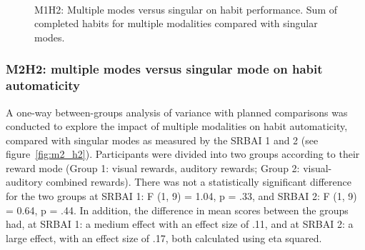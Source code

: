 \begin{figure}[H]
  \centering
  \caption{M1H2: Multiple modes versus singular on habit performance. Sum of completed habits for multiple modalities compared with singular modes.}~\label{fig:m1_h2}
\end{figure}




\subsubsection*{M2H2: multiple modes versus singular mode on habit automaticity}
A one-way between-groups analysis of variance with planned comparisons was conducted to explore the
impact of multiple modalities on habit automaticity, compared with singular modes as measured by the SRBAI 1 and 2 (see figure~\ref{fig:m2_h2}). Participants were divided into two groups according to their reward mode (Group 1: visual rewards, auditory rewards; Group 2: visual-auditory combined rewards). There was not a
statistically significant difference for the two groups at SRBAI 1: F (1, 9) = 1.04, p = .33, and SRBAI 2: F (1, 9) = 0.64, p = .44. In addition, the difference in mean scores between the groups had, at SRBAI 1: a medium effect with an effect size of .11, and at SRBAI 2: a large effect, with an effect size of .17, both calculated using eta squared.



